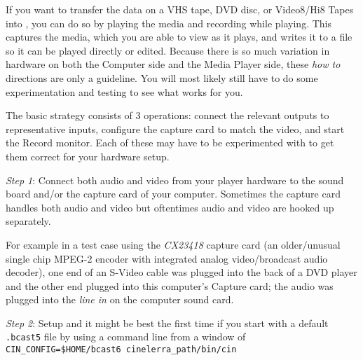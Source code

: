 If you want to transfer the data on a VHS tape, DVD disc, or Video8/Hi8 Tapes into \CGG{}, you
can do so by playing the media and recording while playing.  This captures the media, which you
are able to view as it plays, and writes it to a file so it can be played directly or edited.
Because there is so much variation in hardware on both the Computer side and the Media Player side,
these \textit{how to} directions are only a guideline.  You will most likely still have to do some
experimentation and testing to see what works for you.

The basic strategy consists of 3 operations:  connect the relevant outputs to representative inputs, configure the capture card to match the video, and start the Record monitor.  Each of these may have to be experimented with to get them correct for your hardware setup.

\textit{Step 1}: Connect both audio and video from your player hardware to the sound board and/or the capture card of your computer.  Sometimes the capture card handles both audio and video but oftentimes audio and video are hooked up separately.

For example in a test case using the \textit{CX23418} capture card (an older/unusual single chip MPEG-2 encoder with integrated analog video/broadcast audio decoder), one end of an S-Video cable was plugged into the back of a DVD player and the other end plugged into this computer’s Capture card; the audio was plugged into the \textit{line in} on the computer sound card.

\textit{Step 2}: Setup \CGG{} and it might be best the first time if you start with a default \texttt{.bcast5} file by using a
command line from a window of \\
\texttt{CIN\_CONFIG=\$HOME/bcast6 {cinelerra\_path}/bin/cin}

